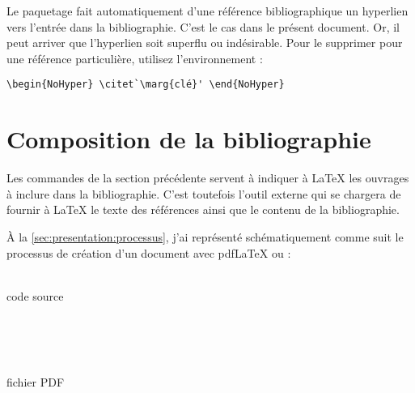 Le paquetage  fait automatiquement d'une référence
bibliographique un hyperlien vers l'entrée dans la bibliographie.
C'est le cas dans le présent document. Or, il peut arriver que
l'hyperlien soit superflu ou indésirable. Pour le supprimer pour une
référence particulière, utilisez l'environnement :
\begin{lstlisting}
\begin{NoHyper} \citet`\marg{clé}' \end{NoHyper}
\end{lstlisting}




\section{Composition de la bibliographie}
\label{sec:bibliographie:bibtex}

Les commandes de la section précédente servent à indiquer à {\LaTeX}
les ouvrages à inclure dans la bibliographie. C'est toutefois l'outil
externe {\BibTeX} qui se chargera de fournir à {\LaTeX} le texte des
références ainsi que le contenu de la bibliographie.

À la \autoref{sec:presentation:processus}, j'ai représenté
schématiquement comme suit le processus de création d'un document avec
pdf{\LaTeX} ou {\XeLaTeX}:
\begin{center}
  \sffamily
  \begin{minipage}[t]{0.12\linewidth}
    \centering
    {\LARGE\faFile[regular]} \\ \medskip
    code source
  \end{minipage}
  \quad\faArrowRight\quad
  \begin{minipage}[t]{0.12\linewidth}
    \centering
    {\LARGE\faCogs} \\ \medskip
     \\ 
  \end{minipage}
  \quad\faArrowRight\quad
  \begin{minipage}[t]{0.12\linewidth}
    \centering
    {\LARGE\faFilePdf[regular]} \\ \medskip
    fichier PDF
  \end{minipage}
\end{center}


